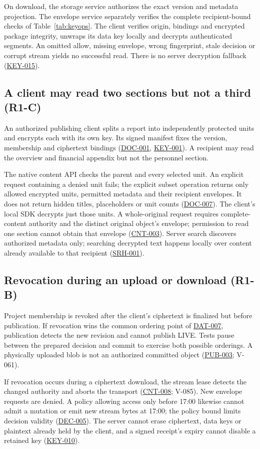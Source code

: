 \documentclass[11pt,a4paper]{article}
\newcommand{\rr}[1]{\hyperlink{req:#1}{#1}}
\begin{document}
On download, the storage service authorizes the exact version and metadata projection. The envelope service separately verifies the complete recipient-bound checks of Table~\ref{tab:keyops}. The client verifies origin, bindings and encrypted package integrity, unwraps its data key locally and decrypts authenticated segments. An omitted allow, missing envelope, wrong fingerprint, stale decision or corrupt stream yields no successful read. There is no server decryption fallback (\rr{KEY-015}).

\subsection{A client may read two sections but not a third (R1-C)}
An authorized publishing client splits a report into independently protected units and encrypts each with its own key. Its signed manifest fixes the version, membership and ciphertext bindings (\rr{DOC-001}, \rr{KEY-001}). A recipient may read the overview and financial appendix but not the personnel section.

The native content API checks the parent and every selected unit. An explicit request containing a denied unit fails; the explicit subset operation returns only allowed encrypted units, permitted metadata and their recipient envelopes. It does not return hidden titles, placeholders or unit counts (\rr{DOC-007}). The client's local SDK decrypts just those units. A whole-original request requires complete-content authority and the distinct original object's envelope; permission to read one section cannot obtain that envelope (\rr{CNT-003}). Server search discovers authorized metadata only; searching decrypted text happens locally over content already available to that recipient (\rr{SRH-001}).

\subsection{Revocation during an upload or download (R1-B)}
Project membership is revoked after the client's ciphertext is finalized but before publication. If revocation wins the common ordering point of \rr{DAT-007}, publication detects the new revision and cannot publish LIVE. Tests pause between the prepared decision and commit to exercise both possible orderings. A physically uploaded blob is not an authorized committed object (\rr{PUB-003}; V-061).

If revocation occurs during a ciphertext download, the stream lease detects the changed authority and aborts the transport (\rr{CNT-008}; V-085). New envelope requests are denied. A policy allowing access only before 17:00 likewise cannot admit a mutation or emit new stream bytes at 17:00; the policy bound limits decision validity (\rr{DEC-005}). The server cannot erase ciphertext, data keys or plaintext already held by the client, and a signed receipt's expiry cannot disable a retained key (\rr{KEY-010}).
\end{document}
